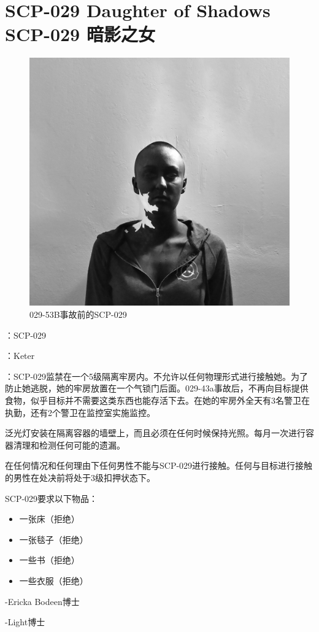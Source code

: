 \chapter[SCP-029 暗影之女]{
    SCP-029 Daughter of Shadows\\
    SCP-029 暗影之女
}

\label{chap:SCP-029}

\begin{figure}[H]
    \centering
    \includegraphics[width=0.5\linewidth]{images/SCP-029.png}
    \caption*{029-53B事故前的SCP-029}
\end{figure}

：SCP-029

：Keter

：SCP-029监禁在一个5级隔离牢房内。不允许以任何物理形式进行接触她。为了防止她逃脱，她的牢房放置在一个气锁门后面。029-43a事故后，不再向目标提供食物，似乎目标并不需要这类东西也能存活下去。在她的牢房外全天有3名警卫在执勤，还有2个警卫在监控室实施监控。

泛光灯安装在隔离容器的墙壁上，而且必须在任何时候保持光照。每月一次进行容器清理和检测任何可能的遗漏。

在任何情况和任何理由下任何男性不能与SCP-029进行接触。任何与目标进行接触的男性在处决前将处于3级扣押状态下。

SCP-029要求以下物品：

\begin{itemize}
\item 一张床（拒绝）
\item 一张毯子（拒绝）
\item 一些书（拒绝）
\item 一些衣服（拒绝）
\end{itemize}

-Ericka Bodeen博士

-Light博士

